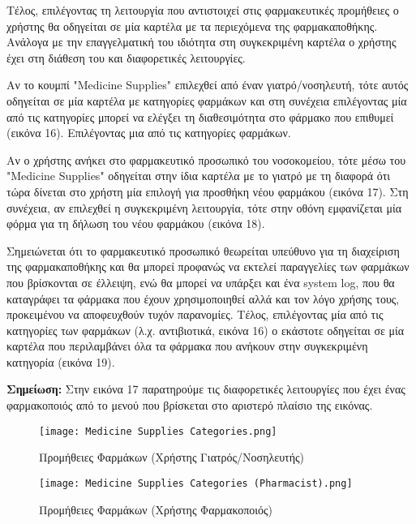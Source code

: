 \documentclass{article}
\begin{document}
Τέλος, επιλέγοντας τη λειτουργία που αντιστοιχεί στις φαρμακευτικές προμήθειες ο χρήστης θα οδηγείται σε μία καρτέλα με τα περιεχόμενα της φαρμακαποθήκης.
Ανάλογα με την επαγγελματική του ιδιότητα στη συγκεκριμένη καρτέλα ο χρήστης έχει στη διάθεση του και διαφορετικές λειτουργίες. \par
Αν το κουμπί "Medicine Supplies" επιλεχθεί από έναν γιατρό/νοσηλευτή, τότε αυτός οδηγείται σε μία καρτέλα με κατηγορίες φαρμάκων και στη συνέχεια επιλέγοντας μία από τις κατηγορίες μπορεί να ελέγξει τη διαθεσιμότητα στο φάρμακο που επιθυμεί (εικόνα 16). Επιλέγοντας μια από τις κατηγορίες φαρμάκων. \par
Αν ο χρήστης ανήκει στο φαρμακευτικό προσωπικό του νοσοκομείου, τότε μέσω του "Medicine Supplies" οδηγείται στην ίδια καρτέλα με το γιατρό με τη διαφορά ότι τώρα δίνεται στο χρήστη μία επιλογή για προσθήκη νέου φαρμάκου (εικόνα 17). Στη συνέχεια, αν επιλεχθεί η συγκεκριμένη λειτουργία, τότε στην οθόνη εμφανίζεται μία φόρμα για τη δήλωση του νέου φαρμάκου (εικόνα 18). \par
Σημειώνεται ότι το φαρμακευτικό προσωπικό θεωρείται υπεύθυνο για τη διαχείριση της φαρμακαποθήκης και θα μπορεί προφανώς να εκτελεί παραγγελίες των φαρμάκων που βρίσκονται σε έλλειψη, ενώ θα μπορεί να υπάρξει και ένα system log, που θα καταγράφει τα φάρμακα που έχουν χρησιμοποιηθεί αλλά και τον λόγο χρήσης τους, προκειμένου να αποφευχθούν τυχόν παρανομίες.
Τέλος, επιλέγοντας μία από τις κατηγορίες των φαρμάκων (λ.χ. αντιβιοτικά, εικόνα 16) ο εκάστοτε οδηγείται σε μία καρτέλα που περιλαμβάνει όλα τα φάρμακα που ανήκουν στην συγκεκριμένη κατηγορία (εικόνα 19). \vspace{0.3cm}

\textbf{Σημείωση:} Στην εικόνα 17 παρατηρούμε τις διαφορετικές λειτουργίες που έχει ένας φαρμακοποιός από το μενού που βρίσκεται στο αριστερό πλαίσιο της εικόνας.

\vspace{0.3cm}

\begin{figure}[!htb]
\centering
\texttt{[image: Medicine Supplies Categories.png]} 
\caption{\label{fig:doctor/nurse} Προμήθειες Φαρμάκων (Χρήστης Γιατρός/Νοσηλευτής)}
\end{figure}

\vspace{0.3cm}

\begin{figure}[!htb]
\centering
\texttt{[image: Medicine Supplies Categories (Pharmacist).png]} 
\caption{\label{fig:Medical Supplies} Προμήθειες Φαρμάκων (Χρήστης Φαρμακοποιός)}
\end{figure}
\end{document}
